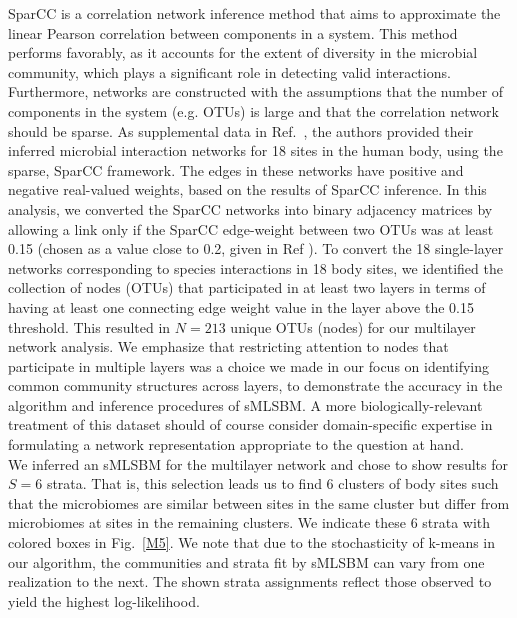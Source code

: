 {\indent SparCC is a correlation network inference method that aims to approximate the linear Pearson correlation between components in a system. This method performs favorably, as it accounts for the extent of diversity in the microbial community, which plays a significant role in detecting valid interactions. Furthermore, networks are constructed with the assumptions that the number of components in the system (e.g. OTUs) is large and that the correlation network should be sparse.  As supplemental data in Ref.~\cite{sparcc}, the authors provided their inferred microbial interaction networks for 18 sites in the human body, using the sparse, SparCC framework. The edges in these networks have positive and negative real-valued weights, based on the results of SparCC inference. In this analysis, we converted the SparCC networks into binary adjacency matrices by allowing a link only if the SparCC edge-weight between two OTUs was at least 0.15 (chosen as a value close to 0.2, given in Ref \cite{sparcc}). To convert the 18 single-layer networks corresponding to species interactions in 18 body sites, we identified the collection of nodes (OTUs) that participated in at least two layers in terms of having at least one connecting edge weight value in the layer above the 0.15 threshold}. This resulted in $N=213$ unique OTUs (nodes) for our multilayer network analysis. We emphasize that restricting attention to nodes that participate in multiple layers was a choice we made in our focus on identifying common community structures across layers, to demonstrate the accuracy in the algorithm and inference procedures of sMLSBM. A more biologically-relevant treatment of this dataset should of course consider domain-specific expertise in formulating a network representation appropriate to the question at hand.\\
\indent We inferred an sMLSBM for the multilayer network and chose to show results for $S=6$ strata. That is, this selection leads us to find 6 clusters of body sites such that the microbiomes are similar between sites in the same cluster but differ from microbiomes at sites in the remaining clusters.
 We indicate these 6 strata with colored boxes in  Fig.~\ref{M5}. We note that due to the stochasticity of k-means in our algorithm, the communities and strata fit by sMLSBM can vary from one realization to the next. The shown strata assignments reflect those observed to yield the highest log-likelihood.

